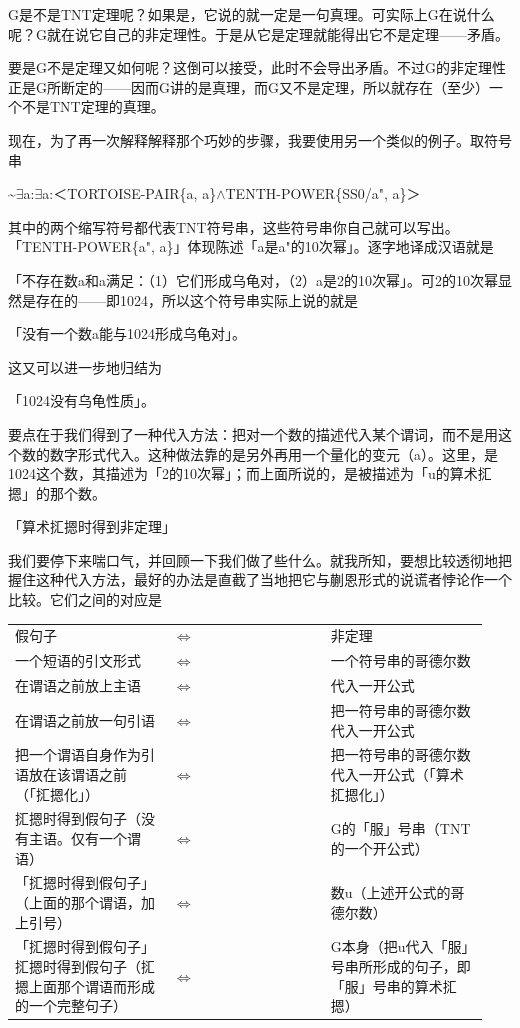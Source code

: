 \documentclass[
  12pt,
  twoside,
  openright,
  oldfontcommands,
]{memoir}
\begin{document}
G是不是TNT定理呢？如果是，它说的就一定是一句真理。可实际上G在说什么呢？G就在说它自己的非定理性。于是从它是定理就能得出它不是定理------矛盾。

要是G不是定理又如何呢？这倒可以接受，此时不会导出矛盾。不过G的非定理性正是G所断定的------因而G讲的是真理，而G又不是定理，所以就存在（至少）一个不是TNT定理的真理。

现在，为了再一次解释解释那个巧妙的步骤，我要使用另一个类似的例子。取符号串

\textasciitilde{}$\exists$a:$\exists$a\textquotesingle:＜TORTOISE-PAIR\{a,
a\textquotesingle\}$\wedge$TENTH-POWER\{SS0/a", a\textquotesingle\}＞

其中的两个缩写符号都代表TNT符号串，这些符号串你自己就可以写出。「TENTH-POWER\{a",
a\textquotesingle\}」体现陈述「a\textquotesingle 是a"的10次幂」。逐字地译成汉语就是

「不存在数a和a\textquotesingle 满足：（1）它们形成乌龟对，（2）a\textquotesingle 是2的10次幂」。可2的10次幂显然是存在的------即1024，所以这个符号串实际上说的就是

「没有一个数a能与1024形成乌龟对」。

这又可以进一步地归结为

「1024没有乌龟性质」。

要点在于我们得到了一种代入方法：把对一个数的描述代入某个谓词，而不是用这个数的数字形式代入。这种做法靠的是另外再用一个量化的变元（a\textquotesingle）。这里，是1024这个数，其描述为「2的10次幂」；而上面所说的，是被描述为「u的算术㧟摁」的那个数。

「算术㧟摁时得到非定理」

我们要停下来喘口气，并回顾一下我们做了些什么。就我所知，要想比较透彻地把握住这种代入方法，最好的办法是直截了当地把它与蒯恩形式的说谎者悖论作一个比较。它们之间的对应是

\begin{longtable}[]{>{\raggedright\arraybackslash}p{0.313\linewidth} >{\raggedright\arraybackslash}p{0.313\linewidth} >{\raggedright\arraybackslash}p{0.313\linewidth}}
\toprule\noalign{}
\endhead
\bottomrule\noalign{}
\endlastfoot
假句子 & $\Leftrightarrow$ & 非定理 \\
一个短语的引文形式 & $\Leftrightarrow$ & 一个符号串的哥德尔数 \\
在谓语之前放上主语 & $\Leftrightarrow$ & 代入一开公式 \\
在谓语之前放一句引语 & $\Leftrightarrow$ & 把一符号串的哥德尔数代入一开公式 \\
把一个谓语自身作为引语放在该谓语之前（「㧟摁化」） & $\Leftrightarrow$ &
把一符号串的哥德尔数代入一开公式（「算术㧟摁化」） \\
㧟摁时得到假句子（没有主语。仅有一个谓语） & $\Leftrightarrow$ &
G的「服」号串（TNT的一个开公式） \\
「㧟摁时得到假句子」（上面的那个谓语，加上引号） & $\Leftrightarrow$ &
数u（上述开公式的哥德尔数） \\
「㧟摁时得到假句子」㧟摁时得到假句子（㧟摁上面那个谓语而形成的一个完整句子）
& $\Leftrightarrow$ & G本身（把u代入「服」号串所形成的句子，即「服」号串的算术㧟摁） \\
\end{longtable}
\end{document}

